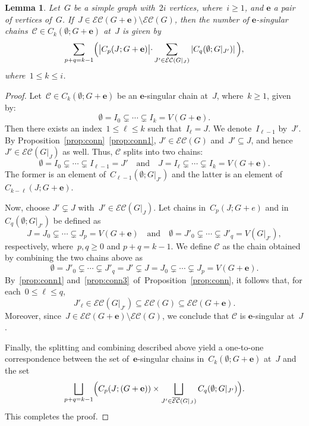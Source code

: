 \documentclass[10pt]{amsart}
\theoremstyle{plain}
\newtheorem{lemma}[theorem]{Lemma}
\numberwithin{equation}{section}
\theoremstyle{definition}
\newcommand{\cC}{\mathcal{C}}
\newcommand{\edge}{\mathbf{e}}
\newcommand{\EC}{\mathcal{E}\mathcal{C}}
\newcommand{\comp}{\overline{\EC}}
\begin{document}
\begin{lemma}\label{lemma:split}
    Let~$G$ be a simple graph with~$2i$ vertices, where~$ i \geq 1$, and $\edge$ a pair of vertices of~$G$.
    If~$J \in \EC(G+\edge) \setminus \EC(G)$, then the number of $\edge$-singular chains~$\cC \in C_k(\emptyset;G+\edge)$ at~$J$ is given by
    $$
    \sum_{p+q = k-1}\Bigl(\bigl|  C_p(J; G + \edge) \bigl| \cdot \sum_{J' \in \EC(G\vert_J)}\left\vert C_q(\emptyset; G\vert_{J'})\right\vert\Bigl),
    $$
    where~$1 \leq k \leq i$.
\end{lemma}

\begin{proof}
    Let~$\cC \in C_k(\emptyset;G+\edge)$ be an $\edge$-singular chain at~$J$, where~$k \geq 1$, given by:
    $$
    \emptyset = I_0 \subsetneq \cdots \subsetneq I_k = V(G+\edge).
    $$
    Then there exists an index~$1 \leq \ell \leq k$ such that~$I_\ell = J$.
    We denote~$I_{\ell-1}$ by~$J'$.
    By Proposition~\ref{prop:conn}~\eqref{prop:conn1}, $J' \in \EC(G)$ and~$J' \subseteq J$, and hence~$J' \in \EC(G\vert_J)$ as well.
    Thus, $\cC$ splits into two chains:
    $$
    \emptyset = I_0 \subsetneq \cdots \subsetneq I_{\ell-1} = J' \quad \text{and} \quad J = I_{\ell} \subsetneq \cdots \subsetneq I_k = V(G+\edge).
    $$
    The former is an element of~$C_{\ell-1}(\emptyset;G\vert_{J'})$ and the latter is an element of~$C_{k-\ell}(J;G+\edge)$.
    
    Now, choose $J' \subsetneq J$ with~$J' \in \EC(G\vert_J)$.
    Let chains in~$C_p(J;G+e)$ and in~$C_q(\emptyset;G\vert_{J'})$ be defined as
    $$
    J = J_0 \subsetneq \cdots \subsetneq J_p = V(G+\edge) \quad \text{and} \quad \emptyset = J'_0 \subsetneq \cdots \subsetneq J'_q = V(G\vert_{J'}),
    $$
    respectively, where~$p, q \geq 0$ and $p+q = k-1$.
    We define $\cC$ as the chain obtained by combining the two chains above as
    $$
    \emptyset = J'_0 \subsetneq \cdots \subsetneq J'_q = J' \subsetneq J = J_0 \subsetneq \cdots \subsetneq J_p =V(G+\edge).
    $$
    By~\eqref{prop:conn1} and~\eqref{prop:conn3}~of~Proposition~\ref{prop:conn}, it follows that, for each~$0 \leq \ell \leq q$,
    $$
    J'_{\ell} \in \EC(G\vert_{J'}) \subseteq \EC(G) \subseteq \EC(G+\edge).
    $$ 
    Moreover, since~$J \in \EC(G+\edge)\setminus \EC(G)$, we conclude that $\cC$ is $\edge$-singular at~$J$.
    
    Finally, the splitting and combining described above yield a one-to-one correspondence between the set of~$\edge$-singular chains in~$C_k(\emptyset;G+\edge)$ at~$J$ and the set
    $$
    \bigsqcup_{p+q = k-1}\Bigl( C_p(J; (G + \edge))  \times \bigsqcup_{J' \in \comp(G\vert_J)} C_q(\emptyset; G\vert_{J'})\Bigl).
    $$
    This completes the proof.
    \end{proof}
    
\end{document}
